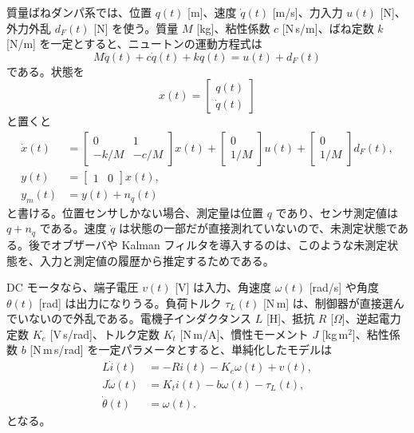 質量ばねダンパ系では、位置 $q(t)$ [m]、速度 $\dot{q}(t)$ [m/s]、力入力 $u(t)$ [N]、外力外乱 $d_F(t)$ [N] を使う。質量 $M$ [kg]、粘性係数 $c$ [N\,s/m]、ばね定数 $k$ [N/m] を一定とすると、ニュートンの運動方程式は
\begin{equation}
  M\ddot{q}(t)+c\dot{q}(t)+kq(t)=u(t)+d_F(t)
  \label{eq:msd-signal-example}
\end{equation}
である。状態を
\begin{equation}
  x(t)=\begin{bmatrix}q(t)\\ \dot{q}(t)\end{bmatrix}
\end{equation}
と置くと
\begin{align}
  \dot{x}(t)&=
  \begin{bmatrix}
    0&1\\
    -k/M&-c/M
  \end{bmatrix}x(t)
  +\begin{bmatrix}0\\ 1/M\end{bmatrix}u(t)
  +\begin{bmatrix}0\\ 1/M\end{bmatrix}d_F(t),\label{eq:msd-state-signal-example}\\
  y(t)&=\begin{bmatrix}1&0\end{bmatrix}x(t),\\
  y_m(t)&=y(t)+n_q(t)
\end{align}
と書ける。位置センサしかない場合、測定量は位置 $q$ であり、センサ測定値は $q+n_q$ である。速度 $\dot{q}$ は状態の一部だが直接測れていないので、未測定状態である。後でオブザーバや Kalman フィルタを導入するのは、このような未測定状態を、入力と測定値の履歴から推定するためである。

DC モータなら、端子電圧 $v(t)$ [V] は入力、角速度 $\omega(t)$ [rad/s] や角度 $\theta(t)$ [rad] は出力になりうる。負荷トルク $\tau_L(t)$ [N\,m] は、制御器が直接選んでいないので外乱である。電機子インダクタンス $L$ [H]、抵抗 $R$ [$\Omega$]、逆起電力定数 $K_e$ [V\,s/rad]、トルク定数 $K_t$ [N\,m/A]、慣性モーメント $J$ [kg\,m$^2$]、粘性係数 $b$ [N\,m\,s/rad] を一定パラメータとすると、単純化したモデルは
\begin{align}
  L\dot{i}(t)&=-R i(t)-K_e\omega(t)+v(t),\label{eq:dc-motor-current}\\
  J\dot{\omega}(t)&=K_t i(t)-b\omega(t)-\tau_L(t),\label{eq:dc-motor-speed}\\
  \dot{\theta}(t)&=\omega(t).\label{eq:dc-motor-angle}
\end{align}
となる。

